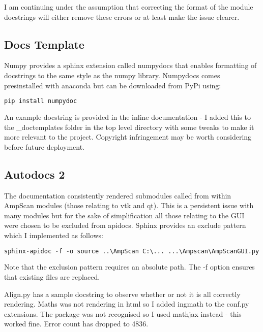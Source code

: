 \documentclass{article}
\begin{document}
I am continuing under the assumption that correcting the format of the module docstrings will either remove these errors or at least make the issue clearer.

\subsection{Docs Template}
Numpy provides a sphinx extension called numpydocs that enables formatting of docstrings to the same style as the numpy library. Numpydocs comes presinstalled with anaconda but can be downloaded from PyPi using:

\begin{lstlisting}[language=Python]
pip install numpydoc
\end{lstlisting}

An example docstring is provided in the inline documentation - I added this to the \_doctemplates folder in the top level directory with some tweaks to make it more relevant to the project. Copyright infringement may be worth considering before future deployment.

\noindent{}

\subsection{Autodocs 2}
The documentation consistently rendered submodules called from within AmpScan modules (those relating to vtk and qt). This is a persistent issue with many modules but for the sake of simplification all those relating to the GUI were chosen to be excluded from apidocs. Sphinx provides an exclude pattern which I implemented as follows:

\begin{lstlisting}[language=Python]
sphinx-apidoc -f -o source ..\AmpScan C:\... ...\Ampscan\AmpScanGUI.py
\end{lstlisting}

Note that the exclusion pattern requires an absolute path. The -f option ensures that existing files are replaced.

Align.py has a sample docstring to observe whether or not it is all correctly rendering. Maths was not rendering in html so I added ingmath to the conf.py extensions. The package was not recognised so I used mathjax instead - this worked fine. Error count has dropped to 4836.
\end{document}
